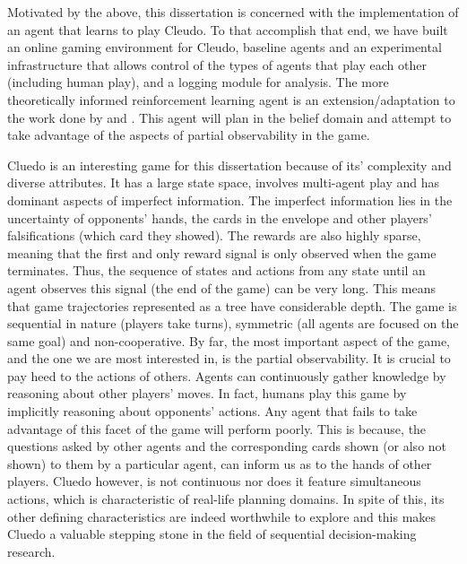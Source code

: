 \documentclass[msc, deptreport, ai, romanprepages]{infthesis}
\begin{document}
Motivated by the above, this dissertation is concerned with the implementation of an agent that learns to play Cleudo. To that accomplish that end, we have built an online gaming environment for Cleudo, baseline agents and an experimental infrastructure that allows control of the types of agents that play each other (including human play), and a logging module for analysis. The more theoretically informed reinforcement learning agent is an extension/adaptation to the work done by \cite{Silver-veness} and \cite{Mihai}. This agent will plan in the belief domain and attempt to take advantage of the aspects of partial observability in the game. 

Cluedo is an interesting game for this dissertation because of its’ complexity and diverse attributes. It has a large state space, involves multi-agent play and has dominant aspects of imperfect information. The imperfect information lies in the uncertainty of opponents’ hands, the cards in the envelope and other players’ falsifications (which card they showed). The rewards are also highly sparse, meaning that the first and only reward signal is only observed when the game terminates. Thus, the sequence of states and actions from any state until an agent observes this signal (the end of the game) can be very long. This means that game trajectories represented as a tree have considerable depth. The game is sequential in nature (players take turns), symmetric (all agents are focused on the same goal) and non-cooperative. By far, the most important aspect of the game, and the one we are most interested in, is the partial observability. It is crucial to pay heed to the actions of others. Agents can continuously gather knowledge by reasoning about other players’ moves. In fact, humans play this game by implicitly reasoning about opponents’ actions. Any agent that fails to take advantage of this facet of the game will perform poorly. This is because, the questions asked by other agents and the corresponding cards shown (or also not shown) to them by a particular agent, can inform us as to the hands of other players. Cluedo however, is not continuous nor does it feature simultaneous actions, which is characteristic of real-life planning domains. In spite of this, its other defining characteristics are indeed worthwhile to explore and this makes Cluedo a valuable stepping stone in the field of sequential decision-making research.
\end{document}
